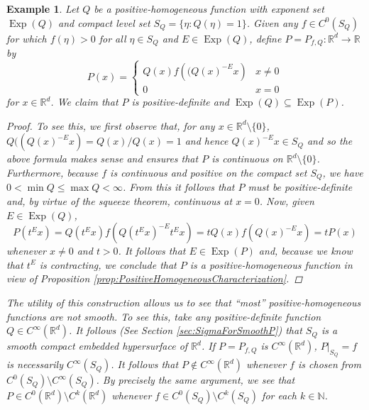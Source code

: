 \documentclass[11pt]{article}
\newtheorem{example}{Example}
\newcommand*{\myproofname}{Proof}
\newenvironment{subproof}[1][\myproofname]{\begin{proof}[#1]\renewcommand*{\qedsymbol}{$\mathbin{/\mkern-6mu/}$}}{\end{proof}}
\newcommand\Exp{\operatorname{Exp}}
\begin{document}
\begin{example}\label{exp:Weierstrass}\normalfont
Let $Q$ be a positive-homogeneous function with exponent set $\Exp(Q)$ and compact level set $S_Q=\{\eta:Q(\eta)=1\}$. Given any $f\in C^0(S_Q)$ for which $f(\eta)>0$ for all $\eta\in S_Q$ and $E\in \Exp(Q)$, define $P=P_{f,Q}:\mathbb{R}^d\to\mathbb{R}$ by
\begin{equation*}
P(x)=\begin{cases}
Q(x)f\left((Q(x)^{-E}x\right) & x\neq 0\\
0 & x=0
\end{cases}
\end{equation*}
for $x\in\mathbb{R}^d$. We claim that $P$ is positive-definite and $\Exp(Q)\subseteq \Exp(P)$.

\begin{subproof}To see this, we first observe that, for any $x\in\mathbb{R}^d\setminus \{0\}$, $Q((Q(x)^{-E}x)=Q(x)/Q(x)=1$ and hence $Q(x)^{-E}x\in S_Q$ and so the above formula makes sense and ensures that $P$ is continuous on $\mathbb{R}^d\setminus\{0\}$. Furthermore, because $f$ is continuous and positive on the compact set $S_Q$, we have $0<\min Q\leq \max Q<\infty$. From this it follows that $P$ must be positive-definite and, by virtue of the squeeze theorem, continuous at $x=0$. Now, given $E\in\Exp(Q)$,
\begin{equation*}
P(t^Ex)=Q(t^Ex)f(Q(t^Ex)^{-E}t^Ex)=tQ(x)f(Q(x)^{-E}x)=tP(x)
\end{equation*}
whenever $x\neq 0$ and $t>0$. It follows that $E\in\Exp(P)$ and, because we know that $t^E$ is contracting, we conclude that $P$ is a positive-homogeneous function in view of Proposition \ref{prop:PositiveHomogeneousCharacterization}. 
\end{subproof}
The utility of this construction allows us to see that ``most'' positive-homogeneous functions are not smooth. To see this, take any positive-definite function $Q\in C^{\infty}(\mathbb{R}^d)$. It follows (See Section \ref{sec:SigmaForSmoothP}) that $S_Q$ is a smooth compact embedded hypersurface of $\mathbb{R}^d$. If $P=P_{f,Q}$ is $C^\infty(\mathbb{R}^d)$, $P\vert_{S_Q}=f$ is necessarily $C^\infty(S_Q)$. It follows that $P\notin C^\infty(\mathbb{R}^d)$ whenever $f$ is chosen from $C^0(S_Q)\setminus C^\infty(S_Q)$. By precisely the same argument, we see that $P\in C^0(\mathbb{R}^d)\setminus C^k(\mathbb{R}^d)$ whenever $f\in C^0(S_Q)\setminus C^k(S_Q)$ for each $k\in\mathbb{N}$.\\


\end{example}
\end{document}
